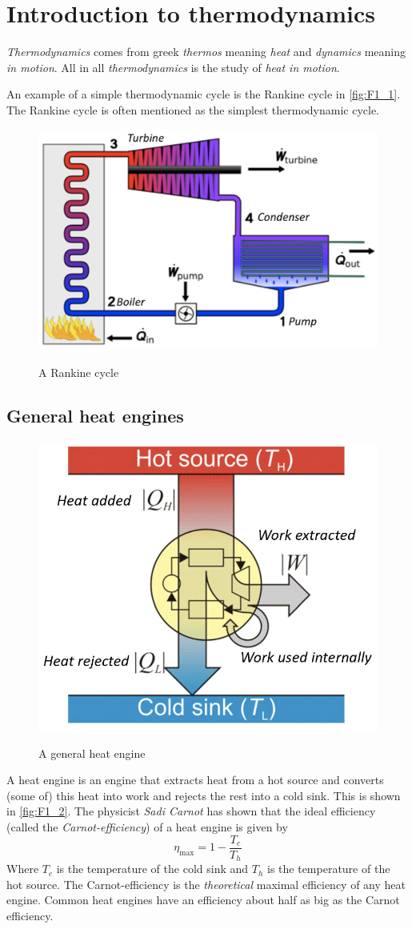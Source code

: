 
\section{Introduction to thermodynamics}

\begin{definition}[Thermodynamics]
  \textit{Thermodynamics} comes from greek \textit{thermos} meaning \textit{heat} and \textit{dynamics} meaning \textit{in motion}. All in all \textit{thermodynamics} is the study of \textit{heat in motion}.
\end{definition}
An example of a simple thermodynamic cycle is the Rankine cycle in \autoref{fig:F1_1}. The Rankine cycle is often mentioned as the simplest thermodynamic cycle.

\begin{figure} [ht]
  \centering
  \caption{A Rankine cycle}
  \includegraphics[width=0.5\linewidth]{./figures/F1_1.png}
  \label{fig:F1_1}
\end{figure}


\subsection{General heat engines}
\begin{figure} [ht]
  \centering
  \caption{A general heat engine}
  \includegraphics[width=0.5\linewidth]{./figures/F1_2.png}
  \label{fig:F1_2}
\end{figure}
A heat engine is an engine that extracts heat from a hot source and converts (some of) this heat into work and rejects the rest into a cold sink. This is shown in \autoref{fig:F1_2}. The physicist \textit{Sadi Carnot} has shown that the ideal efficiency (called the \textit{Carnot-efficiency}) of a heat engine is given by
\[ 
\eta_{\text{max}} = 1 - \frac{T_c}{T_h}
\]
Where $T_c$ is the temperature of the cold sink and $T_h$ is the temperature of the hot source. The Carnot-efficiency is the \textit{theoretical} maximal efficiency of any heat engine. Common heat engines have an efficiency about half as big as the Carnot efficiency.

